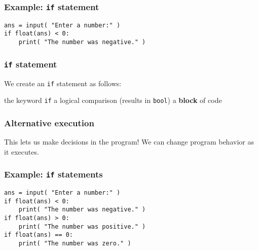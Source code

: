 \documentclass[11pt]{beamer}
\begin{document}
\begin{frame}[fragile]
  \frametitle{Example:  \texttt{if} statement}
  \Enlarge

  \begin{Verbatim}[commandchars=\\\{\},commentchar=\%]
ans = input( "Enter a number:" )
if float(ans) < 0:
    print( "The number was negative." )
  \end{Verbatim}
\end{frame}

\begin{frame}[fragile]
  \frametitle{\texttt{if} statement}
  \Enlarge

  \begin{itemize}
  \myitem  We create an \texttt{if} statement as follows:
    \begin{itemize}
    \mysubitem  the keyword \texttt{if}
    \mysubitem  a logical comparison (results in \texttt{bool})
    \mysubitem  a \textbf{block} of code
    \end{itemize}
  \end{itemize}
\end{frame}

\begin{frame}[fragile]
  \frametitle{Alternative execution}
  \Enlarge

  \begin{itemize}
  \myitem  This lets us make decisions in the program! %
  \myitem  We can change program behavior as it executes.
  \end{itemize}
\end{frame}

\begin{frame}[fragile]
  \frametitle{Example:  \texttt{if} statements}
  \Enlarge

  \begin{Verbatim}[commandchars=\\\{\},commentchar=\%]
ans = input( "Enter a number:" )
if float(ans) < 0:
    print( "The number was negative." )
if float(ans) > 0:
    print( "The number was positive." )
if float(ans) == 0:
    print( "The number was zero." )
  \end{Verbatim}
\end{frame}
\end{document}
